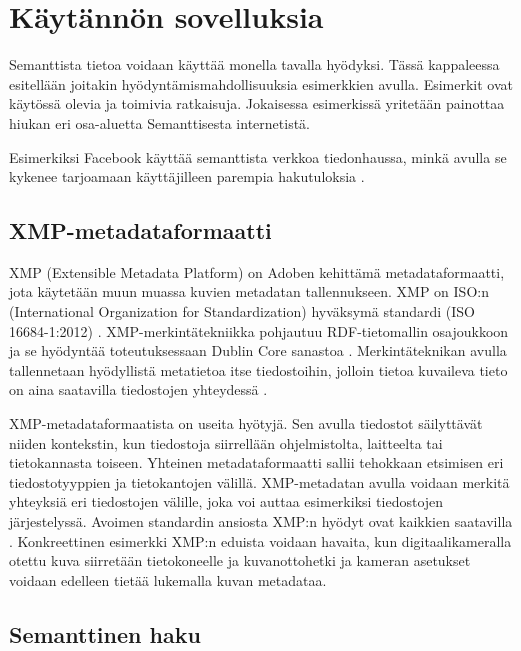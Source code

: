 \documentclass[finnish, 12pt, a4paper, elec, utf8, pdfa, online]{aaltothesis}
\begin{document}
{\clearpage
\section{Käytännön sovelluksia}

Semanttista tietoa voidaan käyttää monella tavalla hyödyksi. Tässä kappaleessa esitellään joitakin hyödyntämismahdollisuuksia esimerkkien avulla. Esimerkit ovat käytössä olevia ja toimivia ratkaisuja. Jokaisessa esimerkissä yritetään painottaa hiukan eri osa-aluetta Semanttisesta internetistä.


Esimerkiksi Facebook käyttää semanttista verkkoa tiedonhaussa, minkä avulla se kykenee tarjoamaan käyttäjilleen parempia hakutuloksia \cite{Facebook}.




\subsection{XMP-metadataformaatti}

XMP (Extensible Metadata Platform) on Adoben kehittämä metadataformaatti, jota käytetään muun muassa kuvien metadatan tallennukseen. XMP on ISO:n (International Organization for Standardization) hyväksymä standardi (ISO 16684-1:2012) \cite{XMP_standard}. XMP-merkintätekniikka pohjautuu RDF-tietomallin osajoukkoon ja se hyödyntää toteutuksessaan Dublin Core sanastoa \cite{XMP2}. Merkintäteknikan avulla tallennetaan hyödyllistä metatietoa itse tiedostoihin, jolloin tietoa kuvaileva tieto on aina saatavilla tiedostojen yhteydessä \cite{XMP1}.

XMP-metadataformaatista on useita hyötyjä. Sen avulla tiedostot säilyttävät niiden kontekstin, kun tiedostoja siirrellään ohjelmistolta, laitteelta tai tietokannasta toiseen. Yhteinen metadataformaatti sallii tehokkaan etsimisen eri tiedostotyyppien ja tietokantojen välillä. XMP-metadatan avulla voidaan merkitä yhteyksiä eri tiedostojen välille, joka voi auttaa esimerkiksi tiedostojen järjestelyssä. Avoimen standardin ansiosta XMP:n hyödyt ovat kaikkien saatavilla \cite{XMP_overall}. Konkreettinen esimerkki XMP:n eduista voidaan havaita, kun digitaalikameralla otettu kuva siirretään tietokoneelle ja kuvanottohetki ja kameran asetukset voidaan edelleen tietää lukemalla kuvan metadataa.


\subsection{Semanttinen haku}

}
\end{document}
